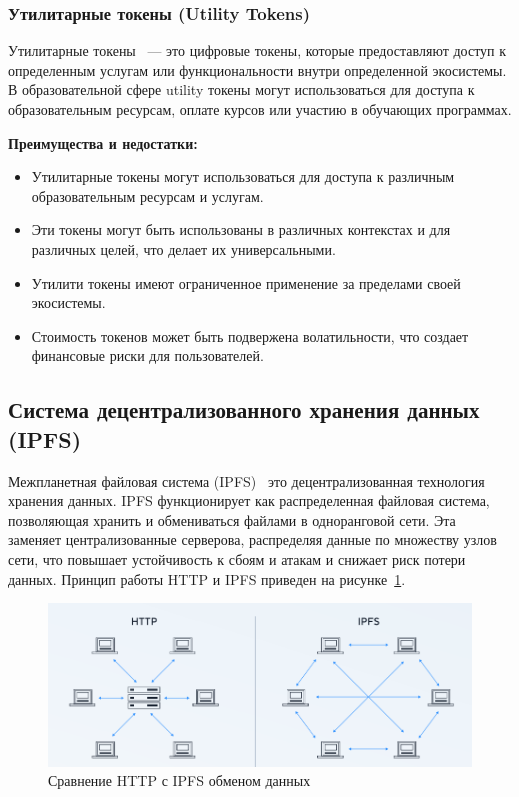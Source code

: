 \subsubsection{Утилитарные токены (Utility Tokens)}

Утилитарные токены~\cite{bib:what_is_utt} --- это цифровые токены, которые предоставляют доступ к определенным услугам или функциональности внутри определенной экосистемы. В образовательной сфере utility токены могут использоваться для доступа к образовательным ресурсам, оплате курсов или участию в обучающих программах.

\textbf{Преимущества и недостатки:}
\begin{itemize}
    \item Утилитарные токены могут использоваться для доступа к различным образовательным ресурсам и услугам.
    \item Эти токены могут быть использованы в различных контекстах и для различных целей, что делает их универсальными.
    \item Утилити токены имеют ограниченное применение за пределами своей экосистемы.
    \item Стоимость токенов может быть подвержена волатильности, что создает финансовые риски для пользователей.
\end{itemize}

\subsection{Система децентрализованного хранения данных (IPFS)}

Межпланетная файловая система (IPFS)~\cite{bib:ipfs, bib:ipfs_is} это децентрализованная технология хранения данных. IPFS функционирует как распределенная файловая система, позволяющая хранить и обмениваться файлами в одноранговой сети. Эта заменяет централизованные серверова, распределяя данные по множеству узлов сети, что повышает устойчивость к сбоям и атакам и снижает риск потери данных. Принцип работы HTTP и IPFS приведен на рисунке~\ref{fig:http_vs_ipfs}.

\begin{figure}[H]   
	\centering
	\includegraphics[width=\textwidth]{images/1.http_vs_ipfs.png}
	\parskip=6pt
	\caption{Сравнение HTTP с IPFS обменом данных}
	\label{fig:http_vs_ipfs}
\end{figure}

